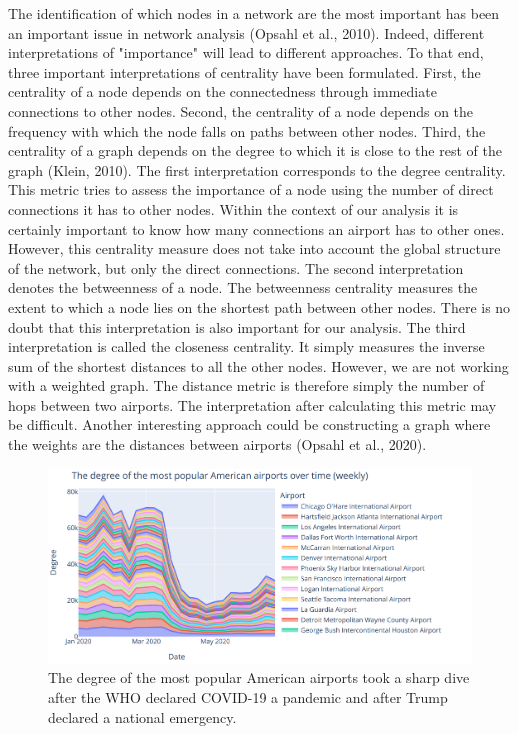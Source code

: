 \documentclass[10pt, a4paper, twocolumn]{article} %
\begin{document}
The identification of which nodes in a network are the most important has been an important issue in network analysis (Opsahl et al., 2010). Indeed, different interpretations of "importance" will lead to different approaches.
To that end, three important interpretations of centrality have been formulated. First, the centrality of a node depends on the connectedness through immediate connections to other nodes. Second, the centrality of a node depends on the frequency with which the node falls on paths between other nodes. Third, the centrality of a graph depends on the degree to which it is close to the rest of the graph (Klein, 2010).
The first interpretation corresponds to the degree centrality. This metric tries to assess the importance of a node using the number of direct connections it has to other nodes. Within the context of our analysis it is certainly important to know how many connections an airport has to other ones. However, this centrality measure does not take into account the global structure of the network, but only the direct connections.
The second interpretation denotes the betweenness of a node. The betweenness centrality measures the extent to which a node lies on the shortest path between other nodes. There is no doubt that this interpretation is also important for our analysis.
The third interpretation is called the closeness centrality. It simply measures the inverse sum of the shortest distances to all the other nodes. However, we are not working with a weighted graph. The distance metric is therefore simply the number of hops between two airports. The interpretation after calculating this metric may be difficult. Another interesting approach could be constructing a graph where the weights are the distances between airports (Opsahl et al., 2020).

\begin{figure}[h]
  \includegraphics[width=\linewidth]{../visualizations/degree_screenshot.png}
  \caption{The degree of the most popular American airports took a sharp dive after the WHO declared COVID-19 a pandemic and after Trump declared a national emergency.}
  \label{fig:degree}
\end{figure}
\end{document}
